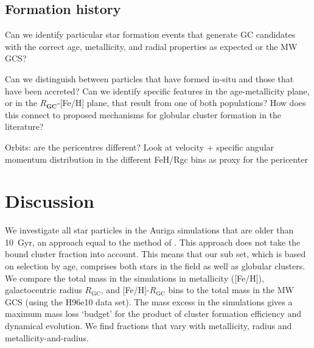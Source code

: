 \documentclass[a4paper,fleqn,usenatbib]{mnras}
\begin{document}
\subsection{Formation history} 
\label{sec:history}
Can we identify particular star formation events that generate GC candidates with the correct age, metallicity, and radial properties as expected or the MW GCS?

Can we distinguish between particles that have formed in-situ and those that have been accreted? Can we identify specific features in the age-metallicity plane, or in the $R_\textbf{GC}$-[Fe/H] plane, that result from one of both populations? How does this connect to proposed mechanisms for globular cluster formation in the literature?


Orbits: are the pericentres different? Look at velocity + specific angular momentum distribution in the different FeH/Rgc bins as proxy for the pericenter




\section{Discussion}
\label{sec:discussion}

We investigate all star particles in the Auriga simulations that are older than 10~Gyr,
an approach equal to the method of \citep{2017MNRAS.465.3622R}. This approach does not
take the bound cluster fraction \citep[e.g.][]{2012MNRAS.426.3008K} into account. This
means that our sub set, which is based on selection by age, comprises both stars in the
field as well as globular clusters. We compare the total mass in the simulations in 
metallicity ([Fe/H]), galactocentric radius $R_{\text{GC}}$, and [Fe/H]-$R_{\text{GC}}$ 
bins to the total mass in the MW GCS (using the H96e10 data set). The mass excess in the
simulations gives a maximum mass loss `budget' for the product of cluster formation 
efficiency and dynamical evolution. We find fractions that vary with metallicity,
radius and metallicity-and-radius.

\end{document}

